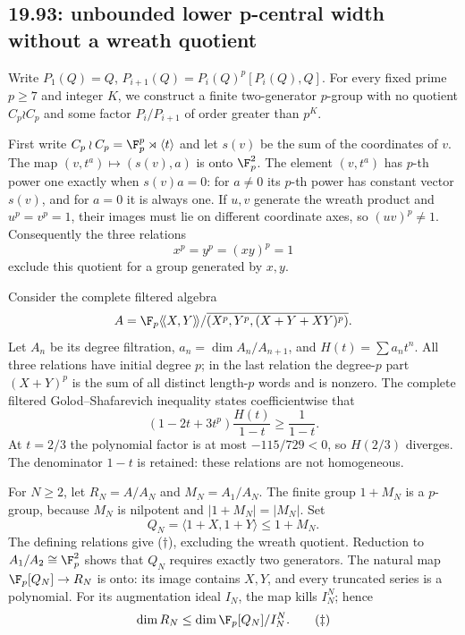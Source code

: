 \subsection{19.93: unbounded lower p-central width without a wreath quotient}
\label{cand:19.93}
Write \(P_1(Q)=Q\), \(P_{i+1}(Q)=P_i(Q)^p[P_i(Q),Q]\).
For every fixed prime \(p\ge7\) and integer \(K\), we construct a
finite two-generator \(p\)-group with no quotient \(C_p\wr C_p\)
and some factor \(P_i/P_{i+1}\) of order greater than \(p^K\).

First write \(C_p\wr C_p=\F_p^p\rtimes\langle t\rangle\) and let
\(s(v)\) be the sum of the coordinates of \(v\).
The map \((v,t^a)\mapsto(s(v),a)\) is onto \(\F_p^2\).
The element \((v,t^a)\) has \(p\)-th power one exactly when
\(s(v)a=0\): for \(a\ne0\) its \(p\)-th power has constant vector
\(s(v)\), and for \(a=0\) it is always one.
If \(u,v\) generate the wreath product and \(u^p=v^p=1\), their
images must lie on different coordinate axes, so \((uv)^p\ne1\).
Consequently the three relations
\[
 x^p=y^p=(xy)^p=1                                  \tag{\(\dagger\)}
\]
exclude this quotient for a group generated by \(x,y\).

Consider the complete filtered algebra
\[
 A=\F_p\langle\!\langle X,Y\rangle\!\rangle/
 \overline{(X^p,Y^p,(X+Y+XY)^p)}.
\]
Let \(A_n\) be its degree filtration, \(a_n=\dim A_n/A_{n+1}\),
and \(H(t)=\sum a_nt^n\).
All three relations have initial degree \(p\); in the last relation
the degree-\(p\) part \((X+Y)^p\) is the sum of all distinct
length-\(p\) words and is nonzero.
The complete filtered Golod--Shafarevich inequality
\cite[Theorem~2.6]{ershov-gs} states coefficientwise that
\[
 (1-2t+3t^p)\frac{H(t)}{1-t}\ge\frac1{1-t}.
\]
At \(t=2/3\) the polynomial factor is at most \(-115/729<0\),
so \(H(2/3)\) diverges.
The denominator \(1-t\) is retained: these relations are not homogeneous.

For \(N\ge2\), let \(R_N=A/A_N\) and \(M_N=A_1/A_N\).
The finite group \(1+M_N\) is a \(p\)-group, because \(M_N\) is
nilpotent and \(|1+M_N|=|M_N|\). Set
\[
 Q_N=\langle1+X,1+Y\rangle\le1+M_N.
\]
The defining relations give (\(\dagger\)), excluding the wreath
quotient. Reduction to \(A_1/A_2\cong\F_p^2\) shows that \(Q_N\)
requires exactly two generators.
The natural map \(\F_p[Q_N]\to R_N\) is onto: its image contains
\(X,Y\), and every truncated series is a polynomial.
For its augmentation ideal \(I_N\), the map kills \(I_N^N\);
hence
\[
 \dim R_N\le\dim\F_p[Q_N]/I_N^N.                    \tag{\(\ddagger\)}
\]

